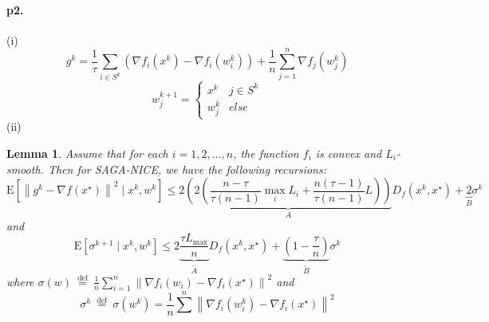 \documentclass[12pt,a4paper]{article}
\newtheorem*{lemma}{Lemma}
\begin{document}
	\paragraph{p2.}	(i)
	\begin{equation}
		g^k=\frac{1}{\tau}\sum_{i\in S^k}(\nabla f_i(x^k)-\nabla f_i(w_i^k))+\frac{1}{n}\sum_{j=1}^{n}\nabla f_j(w_j^k)
	\end{equation}
	\begin{equation}
		w_{j}^{k+1}= \begin{cases}x^{k} & j\in S^k\\ w_{j}^{k} & else \end{cases}
	\end{equation}	
	(ii)
	\begin{lemma}
		Assume that for each $i=1,2, \ldots, n$, the function $f_{i}$ is convex and $L_{i}$-smooth. Then for SAGA-NICE, we have the following recursions:
		$$
		\mathrm{E}\left[\left\|g^{k}-\nabla f\left(x^{\star}\right)\right\|^{2} \mid x^{k}, w^{k}\right] \leq 2 \underbrace{\left(2 \left(\frac{n-\tau}{\tau(n-1)} \max _{i} L_{i}+\frac{n(\tau-1)}{\tau(n-1)} L\right) \right)}_{A} D_{f}\left(x^{k}, x^{\star}\right)+\underbrace{2}_{B} \sigma^{k}
		$$
		and
		$$
		\mathrm{E}\left[\sigma^{k+1} \mid x^{k}, w^{k}\right] \leq 2 \underbrace{\frac{\tau L_{\max }}{n}}_{\tilde{A}} D_{f}\left(x^{k}, x^{\star}\right)+\underbrace{\left(1-\frac{\tau}{n}\right)}_{\tilde{B}} \sigma^{k}
		$$
		where $\sigma(w) \stackrel{\text { def }}{=} \frac{1}{n} \sum_{i=1}^{n}\left\|\nabla f_{i}\left(w_{i}\right)-\nabla f_{i}\left(x^{\star}\right)\right\|^{2}$ and
		$$
		\sigma^{k} \stackrel{\text { def }}{=} \sigma\left(w^{k}\right)=\frac{1}{n} \sum^{n}\left\|\nabla f_{i}\left(w_{i}^{k}\right)-\nabla f_{i}\left(x^{\star}\right)\right\|^{2}
		$$
	\end{lemma}
\end{document}
